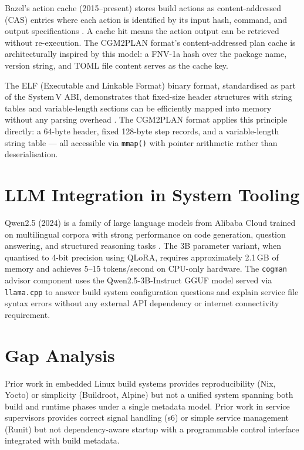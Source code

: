 \documentclass[12pt,a4paper]{report}
\begin{document}
Bazel's action cache (2015--present) stores build actions as content-addressed
(CAS) entries where each action is identified by its input hash, command, and
output specifications \cite{bazel}. A cache hit means the action output can be
retrieved without re-execution. The CGM2PLAN format's content-addressed plan cache
is architecturally inspired by this model: a FNV-1a hash over the package name,
version string, and TOML file content serves as the cache key.

The ELF (Executable and Linkable Format) binary format, standardised as part of
the System\,V ABI, demonstrates that fixed-size header structures with string
tables and variable-length sections can be efficiently mapped into memory without
any parsing overhead \cite{kerrisk}. The CGM2PLAN format applies this principle
directly: a 64-byte header, fixed 128-byte step records, and a variable-length
string table --- all accessible via \texttt{mmap()} with pointer arithmetic rather
than deserialisation.

\section{LLM Integration in System Tooling}

Qwen2.5 (2024) is a family of large language models from Alibaba Cloud trained on
multilingual corpora with strong performance on code generation, question
answering, and structured reasoning tasks \cite{qwen}. The 3B parameter variant,
when quantised to 4-bit precision using QLoRA, requires approximately 2.1\,GB of
memory and achieves 5--15 tokens/second on CPU-only hardware. The
\texttt{cogman} advisor component uses the Qwen2.5-3B-Instruct GGUF model served
via \texttt{llama.cpp} \cite{llamacpp} to answer build system configuration
questions and explain service file syntax errors without any external API
dependency or internet connectivity requirement.

\section{Gap Analysis}

Prior work in embedded Linux build systems provides reproducibility (Nix, Yocto)
or simplicity (Buildroot, Alpine) but not a unified system spanning both build and
runtime phases under a single metadata model. Prior work in service supervisors
provides correct signal handling (s6) or simple service management (Runit) but
not dependency-aware startup with a programmable control interface integrated with
build metadata.
\end{document}
